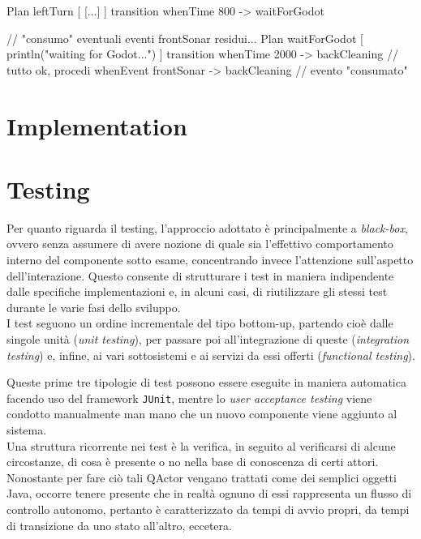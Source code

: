\documentclass{../llncs}
\newcommand{\labelsec}[1]{\label{sec:#1}}
\newcommand{\labelssec}[1]{\label{ssec:#1}}
\begin{document}
\begin{qacode}[caption={SoftwareAgent, pt12}]
Plan leftTurn [
	[...]
]
transition
	whenTime 800 -> waitForGodot

// "consumo" eventuali eventi frontSonar residui...
Plan waitForGodot [
	println("waiting for Godot...")
]
transition
	whenTime 2000 -> backCleaning // tutto ok, procedi
	whenEvent frontSonar -> backCleaning // evento "consumato"
\end{qacode}

\section{Implementation}
\labelsec{Implementation}

\labelssec{robotImpl}

\section{Testing}
\labelsec{Testing}

Per quanto riguarda il testing, l'approccio adottato è principalmente a \emph{black-box}, ovvero senza assumere di avere nozione di quale sia l'effettivo comportamento interno del componente sotto esame, concentrando invece l'attenzione sull'aspetto dell'interazione. Questo consente di strutturare i test in maniera indipendente dalle specifiche implementazioni e, in alcuni casi, di riutilizzare gli stessi test durante le varie fasi dello sviluppo.\\

I test seguono un ordine incrementale del tipo bottom-up, partendo cioè dalle singole unità (\emph{unit testing}), per passare poi all'integrazione di queste (\emph{integration testing}) e, infine, ai vari sottosistemi e ai servizi da essi offerti (\emph{functional testing}).

Queste prime tre tipologie di test possono essere eseguite in maniera automatica facendo uso del framework \texttt{JUnit}, mentre lo \emph{user acceptance testing} viene condotto manualmente man mano che un nuovo componente viene aggiunto al sistema.\\

Una struttura ricorrente nei test è la verifica, in seguito al verificarsi di alcune circostanze, di cosa è presente o no nella base di conoscenza di certi attori. Nonostante per fare ciò tali QActor vengano trattati come dei semplici oggetti Java, occorre tenere presente che in realtà ognuno di essi rappresenta un flusso di controllo autonomo, pertanto è caratterizzato da tempi di avvio propri, da tempi di transizione da uno stato all'altro, eccetera.
\end{document}
